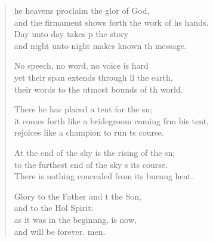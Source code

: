 \settowidth{\versewidth}{it comes forth like a bridegroom coming from his tent, *}
\begin{verse}%
  \begin{patverse}
he heavens proclaim the glor of God,\Med\\
and the firmament shows forth the work of h\pointup{\i}s hands.\\
Day unto day takes p the story\Med\\
and night unto night makes known th message.

No speech, no word, no voice is hard\Flex\\
yet their span extends through ll the earth,\Med\\
their words to the utmost bounds of th world.

There he has placed a tent for the sn;\Flex\\
it comes forth like a bridegroom coming frm his tent,\Med\\
rejoices like a champion to run \pointup{\i}ts course.

At the end of the sky is the rising of the sn;\Flex\\
to the furthest end of the sky \pointup{\i}s its course.\Med\\
There is nothing concealed from its burn\pointup{\i}ng heat.

Glory to the Father and t the Son,\Med\\
and to the Hol Spirit:\\
as it was in the beginn\pointup{\i}ng, is now,\Med\\
and will be forever. men. 
  \end{patverse}
\end{verse}
